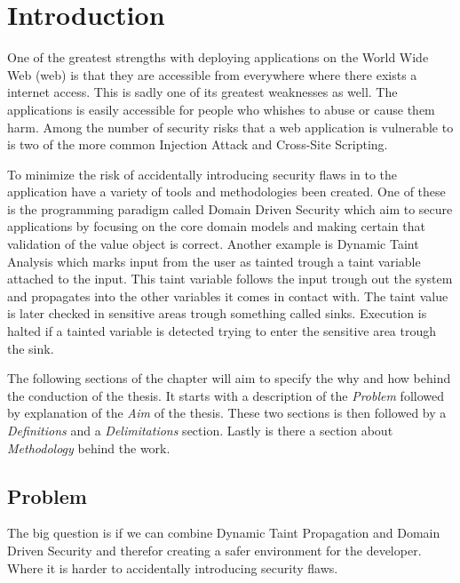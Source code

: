 \chapter{Introduction}
One of the greatest strengths with deploying applications on the World Wide Web (web) is that they are accessible from everywhere where there exists a internet access. This is sadly one of its greatest weaknesses as well. The applications is easily accessible for people who whishes to abuse or cause them harm. Among the number of security risks that a web application is vulnerable to is two of the more common Injection Attack and Cross-Site Scripting. \parencite{OpenWebApplicationSecurityProject, CrossMichael2007Dgtw}

To minimize the risk of accidentally introducing security flaws in to the application have a variety of tools and methodologies been created. One of these is the programming paradigm called Domain Driven Security which aim to secure applications by focusing on the core domain models and making certain that validation of the value object is correct. Another example is Dynamic Taint Analysis which marks input from the user as tainted trough a taint variable attached to the input. This taint variable follows the input trough out the system and propagates into the other variables it comes in contact with. The taint value is later checked in sensitive areas trough something called sinks. Execution is halted if a tainted variable is detected trying to enter the sensitive area trough the sink. 

The following sections of the chapter will aim to specify the why and how behind the conduction of the thesis. It starts with a description of the \textit{Problem} followed by explanation of the \textit{Aim} of the thesis. These two sections is then followed by a \textit{Definitions} and a \textit{Delimitations} section. Lastly is there a section about \textit{Methodology} behind the work.


\section{Problem}
The big question is if we can combine Dynamic Taint Propagation and Domain Driven Security and therefor creating a safer environment for the developer. Where it is harder to accidentally introducing security flaws. 


